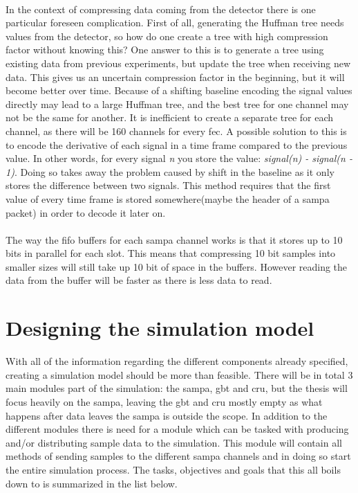 \documentclass[a4paper, 12pt]{report}\dfrac{\right }{•}
\begin{document}
\paragraph{}
In the context of compressing data coming from the detector there is one particular foreseen complication.
First of all, generating the Huffman tree needs values from the detector, so how do one create a tree with high compression factor without knowing this?
One answer to this is to generate a tree using existing data from previous experiments, but update the tree when receiving new data.
This gives us an uncertain compression factor in the beginning, but it will become better over time.
Because of a shifting baseline encoding the signal values directly may lead to a large Huffman tree, and the best tree for one channel may not be the same for another.
It is inefficient to create a separate tree for each channel, as there will be 160 channels for every \gls{fec}.
A possible solution to this is to encode the derivative of each signal in a time frame compared to the previous value.
In other words, for every signal \textit{n} you store the value: \textit{signal(n) - signal(n - 1)}.
Doing so takes away the problem caused by shift in the baseline as it only stores the difference between two signals.
This method requires that the first value of every time frame is stored somewhere(maybe the header of a \gls{sampa} packet) in order to decode it later on.


\paragraph{}
The way the \gls{fifo} buffers for each \gls{sampa} channel works is that it stores up to 10 bits in parallel for each slot.
This means that compressing 10 bit samples into smaller sizes will still take up 10 bit of space in the buffers. 
However reading the data from the buffer will be faster as there is less data to read.

\section{Designing the simulation model}
With all of the information regarding the different components already specified, creating a simulation model should be more than feasible.
There will be in total 3 main modules part of the simulation: the \gls{sampa}, \gls{gbt} and \gls{cru}, but the thesis will focus heavily on the \gls{sampa}, leaving the \gls{gbt} and \gls{cru} mostly empty as what happens after data leaves the \gls{sampa} is outside the scope.
In addition to the different modules there is need for a module which can be tasked with producing and/or distributing sample data to the simulation.
This module will contain all methods of sending samples to the different \gls{sampa} channels and in doing so start the entire simulation process.
The tasks, objectives and goals that this all boils down to is summarized in the list below.
\end{document}
